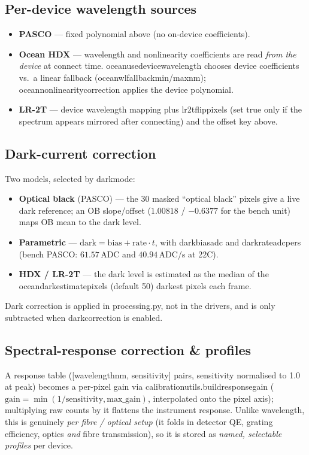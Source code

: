\documentclass[12pt,a4paper]{article}
\DeclareRobustCommand{\code}[1]{{\ttfamily\small\def\_{\rawus\allowbreak}#1}}
\DeclareRobustCommand{\file}[1]{{\ttfamily\small\def\_{\rawus\allowbreak}#1}}
\DeclareRobustCommand{\key}[1]{{\ttfamily\small\color{acc2}\def\_{\rawus\allowbreak}#1}}
\begin{document}
\subsection{Per-device wavelength sources}
\begin{itemize}
  \item \textbf{PASCO} --- fixed polynomial above (no on-device coefficients).
  \item \textbf{Ocean HDX} --- wavelength and nonlinearity coefficients are read
        \emph{from the device} at connect time. \key{ocean\_use\_device\_wavelength}
        chooses device coefficients vs.\ a linear fallback
        (\key{ocean\_wl\_fallback\_min/max\_nm}); \key{ocean\_nonlinearity\_correction}
        applies the device polynomial.
  \item \textbf{LR-2T} --- device wavelength mapping plus \key{lr2t\_flip\_pixels}
        (set true only if the spectrum appears mirrored after connecting) and the
        offset key above.
\end{itemize}

\subsection{Dark-current correction}
Two models, selected by \key{dark\_mode}:
\begin{itemize}
  \item \textbf{Optical black} (PASCO) --- the 30 masked ``optical black'' pixels
        give a live dark reference; an OB slope/offset
        ($1.00818$ / $-0.6377$ for the bench unit) maps OB mean to the dark level.
  \item \textbf{Parametric} --- $\text{dark} = \text{bias} + \text{rate}\cdot t$,
        with \key{dark\_bias\_adc} and \key{dark\_rate\_adc\_per\_s}
        (bench PASCO: $61.57\,$ADC and $40.94\,$ADC/s at 22\textdegree C).
  \item \textbf{HDX / LR-2T} --- the dark level is estimated as the median of the
        \key{ocean\_dark\_estimate\_pixels} (default 50) darkest pixels each frame.
\end{itemize}
Dark correction is applied in \file{processing.py}, not in the drivers, and is only
subtracted when \key{dark\_correction} is enabled.

\subsection{Spectral-response correction \& profiles}\label{sec:response}
A response table (\code{[wavelength\_nm, sensitivity]} pairs, sensitivity
normalised to 1.0 at peak) becomes a per-pixel gain via
\code{calibration\_utils.build\_response\_gain}
($\text{gain} = \min(1/\text{sensitivity}, \text{max\_gain})$, interpolated onto
the pixel axis); multiplying raw counts by it flattens the instrument response.
Unlike wavelength, this is genuinely \emph{per fibre / optical setup} (it folds in
detector QE, grating efficiency, optics \emph{and} fibre transmission), so it is
stored as \emph{named, selectable profiles} per device.
\end{document}

